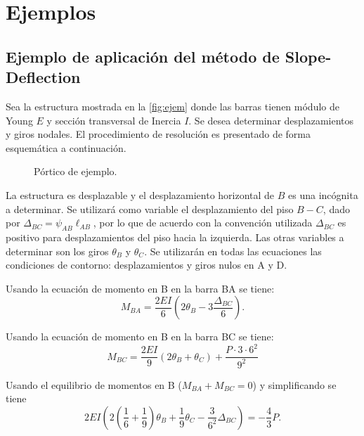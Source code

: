 \section{Ejemplos}



\subsection{Ejemplo de aplicación del método de Slope-Deflection}

Sea la estructura mostrada en la \autoref{fig:ejem} donde las barras tienen módulo de Young $E$ y sección transversal de Inercia $I$. %
%
Se desea determinar desplazamientos y giros nodales. %
El procedimiento de resolución es presentado de forma esquemática a continuación.

\begin{figure}[htb]
	\centering
\def\svgwidth{0.55\textwidth}

	\caption{Pórtico de ejemplo.}
	\label{fig:ejem}
\end{figure}

La estructura es desplazable y el desplazamiento horizontal de $B$ es una incógnita a determinar. %
%
Se utilizará como variable el desplazamiento del piso $B-C$, dado por $\Delta_{BC} = \psi_{AB} \ell_{AB}$, por lo que de acuerdo con la convención utilizada $\Delta_{BC}$ es positivo para desplazamientos del piso hacia la izquierda.
Las otras variables a determinar son los giros $\theta_B$ y $\theta_C$. %
%
Se utilizarán en todas las ecuaciones las condiciones de contorno: desplazamientos y giros nulos en A y D.


Usando la ecuación de momento en B en la barra BA se tiene:
\begin{equation}
M_{BA} = \frac{2EI}{6} ( 2\theta_B - 3 \frac{ \Delta_{BC} } {6} ).
\end{equation}

Usando la ecuación de momento en B en la barra BC se tiene:
\begin{equation}
M_{BC} = \frac{2EI}{9} (2\theta_B +\theta_C ) + \frac{ P \cdot 3 \cdot 6^2}{9^2}
\end{equation}

Usando el equilibrio de momentos en B ($M_{BA}+M_{BC}=0$) y simplificando se tiene
\begin{equation}
\boxed{
	2EI \left( 2 \left( \frac{1}{6}+\frac{1}{9} \right) \theta_B + \frac{1}{9} \theta_C - \frac{3 }{6^2} \Delta_{BC} \right) = - \frac{4}{3} P.
}
\end{equation}

